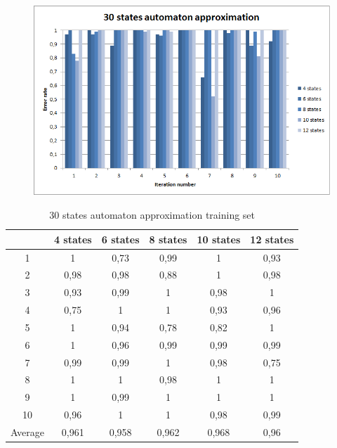 \documentclass[runningheads,a4paper]{llncs}
\begin{document}
\begin{figure}
\centering
\includegraphics[scale=1]{3.png}
\end{figure}

\begin{table}[]
\centering
\caption{30 states automaton approximation training set}
\label{my-label}
\begin{tabular}{@{}cccccc@{}}
\toprule
        & 4 states & 6 states & 8 states & 10 states & 12 states    \\ \midrule
1       & 1        & 0,73     & 0,99     & 1         & 0,93 \\
2       & 0,98     & 0,98     & 0,88     & 1         & 0,98 \\
3       & 0,93     & 0,99     & 1        & 0,98      & 1 \\
4       & 0,75     & 1        & 1        & 0,93      & 0,96   \\
5       & 1        & 0,94     & 0,78     & 0,82      & 1   \\
6       & 1        & 0,96     & 0,99     & 0,99      & 0,99    \\
7       & 0,99     & 0,99     & 1        & 0,98      & 0,75    \\
8       & 1        & 1        & 0,98     & 1         & 1    \\
9       & 1        & 0,99     & 1        & 1         & 1 \\
10      & 0,96     & 1        & 1        & 0,98      & 0,99  \\
Average & 0,961    & 0,958    & 0,962    & 0,968     & 0,96  \\ \bottomrule
\end{tabular}
\end{table}
\end{document}
